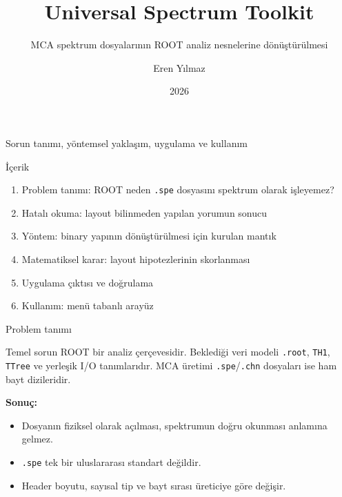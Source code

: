 \documentclass[aspectratio=169,11pt]{beamer}
\title{Universal Spectrum Toolkit}
\subtitle{MCA spektrum dosyalarının ROOT analiz nesnelerine dönüştürülmesi}
\author{Eren Yılmaz}
\institute{Teknik sunum}
\date{2026}
\begin{document}
\begin{frame}[plain]
  \titlepage
  \vspace{-0.4em}
  \begin{center}
    \small\textcolor{ustgray}{Sorun tanımı, yöntemsel yaklaşım, uygulama ve kullanım}
  \end{center}
\end{frame}

\begin{frame}{İçerik}
  \begin{enumerate}
    \item Problem tanımı: ROOT neden \texttt{.spe} dosyasını spektrum olarak işleyemez?
    \item Hatalı okuma: layout bilinmeden yapılan yorumun sonucu
    \item Yöntem: binary yapının dönüştürülmesi için kurulan mantık
    \item Matematiksel karar: layout hipotezlerinin skorlanması
    \item Uygulama çıktısı ve doğrulama
    \item Kullanım: menü tabanlı arayüz
  \end{enumerate}
\end{frame}

\begin{frame}{Problem tanımı}
  \begin{alertblock}{Temel sorun}
    ROOT bir analiz çerçevesidir. Beklediği veri modeli \texttt{.root},
    \texttt{TH1}, \texttt{TTree} ve yerleşik I/O tanımlarıdır.
    MCA üretimi \texttt{.spe}/\texttt{.chn} dosyaları ise ham bayt dizileridir.
  \end{alertblock}

  \vspace{0.5em}
  \textbf{Sonuç:}
  \begin{itemize}
    \item Dosyanın fiziksel olarak açılması, spektrumun doğru okunması anlamına gelmez.
    \item \texttt{.spe} tek bir uluslararası standart değildir.
    \item Header boyutu, sayısal tip ve bayt sırası üreticiye göre değişir.
  \end{itemize}
\end{frame}
\end{document}

